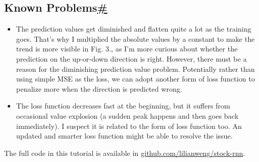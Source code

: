 \subsection{\texorpdfstring{Known Problems\hyperref[known-problems]{\#}}{Known Problems\#}}\label{known-problems}

\begin{itemize}
\item
  The prediction values get diminished and flatten quite a lot as the training goes. That's why I multiplied the absolute values by a constant to make the trend is more visible in Fig. 3., as I'm more curious about whether the prediction on the up-or-down direction is right. However, there must be a reason for the diminishing prediction value problem. Potentially rather than using simple MSE as the loss, we can adopt another form of loss function to penalize more when the direction is predicted wrong.
\item
  The loss function decreases fast at the beginning, but it suffers from occasional value explosion (a sudden peak happens and then goes back immediately). I suspect it is related to the form of loss function too. An updated and smarter loss function might be able to resolve the issue.
\end{itemize}

The full code in this tutorial is available in \href{https://github.com/lilianweng/stock-rnn}{github.com/lilianweng/stock-rnn}.
